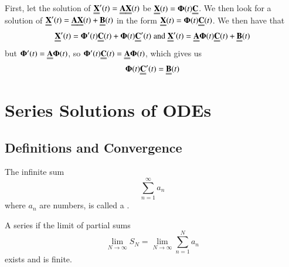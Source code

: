 \documentclass[12pt, a4paper, oneside, openright, titlepage]{book}
\begin{document}


\begin{defn}
        First, let the solution of $\Emph{X}'(t) = \Emph{A}\Emph{X}(t)$ be $\Emph{X}(t) = \boldsymbol{\Phi}(t)\Emph{C}$. We then look for a solution of $\Emph{X}'(t) = \Emph{A}\Emph{X}(t) + \Emph{B}(t)$ in the form $\Emph{X}(t) = \boldsymbol{\Phi}(t)\Emph{C}(t)$. We then have that $$\Emph{X}'(t) = \boldsymbol{\Phi}'(t)\Emph{C}(t) + \boldsymbol{\Phi}(t)\Emph{C}'(t)\;\text{and}\;\Emph{X}'(t) = \Emph{A}\boldsymbol{\Phi}(t)\Emph{C}(t)+\Emph{B}(t)$$ but $\boldsymbol{\Phi}'(t) = \Emph{A}\boldsymbol{\Phi}(t)$, so $\boldsymbol{\Phi}'(t)\Emph{C}(t) = \Emph{A}\boldsymbol{\Phi}(t)$, which gives us \begin{equation}
                \boldsymbol{\Phi}(t)\Emph{C}'(t) = \Emph{B}(t)
        \end{equation}
\end{defn}







\clearpage

\chapter{Series Solutions of ODEs}


\section{Definitions and Convergence}

\begin{defn}[Series]
        The infinite sum \begin{equation}
                \sum\limits_{n=1}^{\infty}a_n
        \end{equation}
        where $a_n$ are numbers, is called a .
\end{defn}



\begin{defn}[Converges]
        A series  if the limit of partial sums \begin{equation}
                \lim\limits_{N\rightarrow \infty}S_N = \lim\limits_{N\rightarrow \infty}\sum\limits_{n=1}^Na_n
        \end{equation}
        exists and is finite.
\end{defn}


\end{document}
